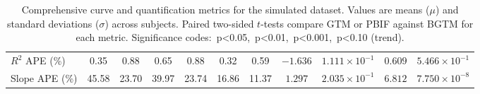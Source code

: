 \begin{sidewaystable}[b]
\begin{tabular}{l|cc|cc|cc|cc|cc}
		\(R^2\) APE (\%)                 & 0.35                               & 0.88                              & 0.65                               & 0.88                                      & 0.32                                      & 0.59       & \(-1.636\) & \(1.111\times10^{-1}\)        & \(0.609\) & \(5.466\times10^{-1}\)  \\
		Slope APE (\%)                   & 45.58                              & 23.70                             & 39.97                              & 23.74                                     & 16.86                                     & 11.37      & \(1.297\)  & \(2.035\times10^{-1}\)        & \(6.812\) & \(7.750\times10^{-8}\)  \\
		\bottomrule
	\end{tabular}
	\caption{Comprehensive curve and quantification metrics for the simulated dataset.
		Values are means (\(\mu\)) and standard deviations (\(\sigma\)) across subjects.
		Paired two-sided \(t\)-tests compare GTM or PBIF against BGTM for each metric.
		Significance codes: \sym{*}\,p<0.05, \sym{**}\,p<0.01, \sym{***}\,p<0.001, \sym{\dag}\,p<0.10 (trend).}
	\label{tab:metrics_all_sim}
\end{sidewaystable}
